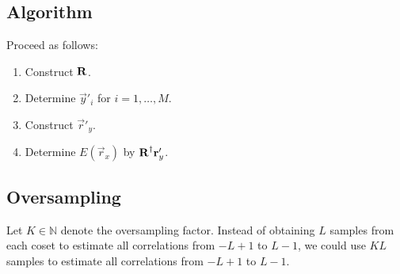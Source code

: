 \documentclass[a4paper, openany, oneside]{memoir}
\begin{document}
\subsection{Algorithm}
Proceed as follows:
\begin{enumerate}
    \item Construct $\boldsymbol{\mathbf{R}}$.
    \item Determine $\vec{y}'_i$ for $i = 1,\ldots,M$.
    \item Construct $\vec{r}'_y$.
    \item Determine $E(\vec{r}_x)$ by $\boldsymbol{\mathbf{R}}^\dagger\boldsymbol{\mathbf{r}}'_y$.
\end{enumerate}

\subsection{Oversampling}
Let $K \in \mathbb{N}$ denote the oversampling factor. Instead of obtaining $L$ samples from each coset to estimate all correlations from $-L+1$ to $L-1$, we could use $KL$ samples to estimate all correlations from $-L+1$ to $L-1$.
\end{document}
